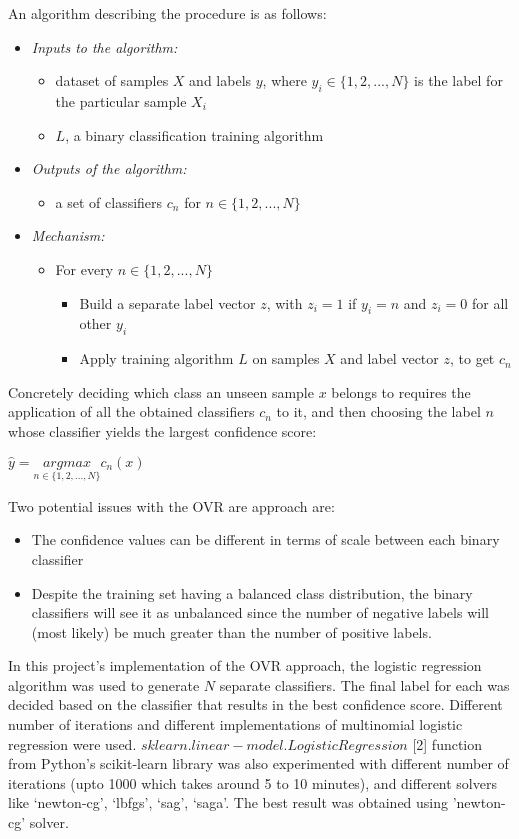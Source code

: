 \documentclass[journal]{IEEEtran}
\begin{document}
An algorithm describing the procedure is as follows:
\begin{itemize}
\item\textit{Inputs to the algorithm:}
\begin{itemize}
\item dataset of samples $X$ and labels $y$, where $y_{i} \in \{1, 2, ..., N\}$ is the label for the particular sample $X_{i}$
\item $L$, a binary classification training algorithm 
\end{itemize}
\item\textit{Outputs of the algorithm:}
\begin{itemize}
\item a set of classifiers $c_{n}$ for $n \in \{1, 2, ..., N\}$
\end{itemize}
\item\textit{Mechanism:}
\begin{itemize}
\item For every $n \in \{1, 2, ..., N\}$
	\begin{itemize}
	\item Build a separate label vector $z$, with $z_{i} = 1$ if $y_{i} = n$ and $z_{i} = 0$ for all other $y_{i}$
	\item Apply training algorithm $L$ on samples $X$ and label vector $z$, to get $c_{n}$ 
	\end{itemize}
\end{itemize}
\end{itemize}\par
Concretely deciding which class an unseen sample $x$ belongs to requires the application of all the obtained classifiers $c_{n}$ to it, and then choosing the label $n$ whose classifier yields the largest confidence score:
\begin{center}
${\hat{y}} =\underset{n\in\{1, 2, ..., N\}}{argmax} c_{n}(x)$
\end{center} \par
Two potential issues with the OVR are approach are:
\begin{itemize}
\item The confidence values can be different in terms of scale between each binary classifier
\item Despite the training set having a balanced class distribution, the binary classifiers will see it as unbalanced since the number of negative labels will (most likely) be much greater than the number of positive labels.
\end{itemize}
In this project's implementation of the OVR approach, the logistic regression algorithm was used to generate $N$ separate classifiers. The final label for each was decided based on the classifier that results in the best confidence score. Different number of iterations and different implementations of multinomial logistic regression were used. $sklearn.linear-model.LogisticRegression$ [2] function from Python's scikit-learn library was also experimented with different number of iterations (upto 1000 which takes around 5 to 10 minutes), and different solvers like ‘newton-cg’, ‘lbfgs’, ‘sag’, ‘saga’. The best result was obtained using 'newton-cg' solver. 
\end{document}
